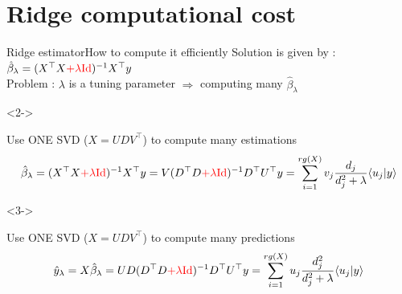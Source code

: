 \documentclass[10pt,aspectratio=43]{beamer}
\begin{document}
\section{Ridge computational cost}
\begin{frame}{Ridge estimator}{How to compute it efficiently}
    Solution is given by : $ \hat \beta_{\lambda} = (X^\top X \textcolor{red}{+ \lambda \mathrm{Id}})^{-1}X^\top y$
    \\
    Problem : $\lambda$ is a tuning parameter $\Longrightarrow$ computing many $\hat \beta_{\lambda}$
   \begin{onlyenv}<2->
        \begin{block}{Use ONE SVD ($X = U D V^\top$) to compute many estimations}
        $$    \hat \beta_{\lambda} = (X^\top X \textcolor{red}{+ \lambda \mathrm{Id}})^{-1}X^\top y
            = V(D^\top D \textcolor{red}{+ \lambda \mathrm{Id}})^{-1}D^\top U^\top y
            = \sum_{i=1}^{rg(X)} v_j \frac{d_j}{d_j^2 + \lambda} \langle u_j \vert y \rangle $$
        \end{block}
    \end{onlyenv}
    \begin{onlyenv}<3->
        \begin{block}{Use ONE SVD ($X = U D V^\top$) to compute many predictions}
        $$ \hat y_\lambda  = X \hat \beta_{\lambda} %
        = U D (D^\top D \textcolor{red}{+ \lambda \mathrm{Id}})^{-1}D^\top U^\top y
        = \sum_{i=1}^{rg(X)} u_j \frac{d_j^2}{d_j^2 + \lambda} \langle u_j \vert y \rangle $$
        \end{block}
    \end{onlyenv}
\end{frame}
\end{document}
